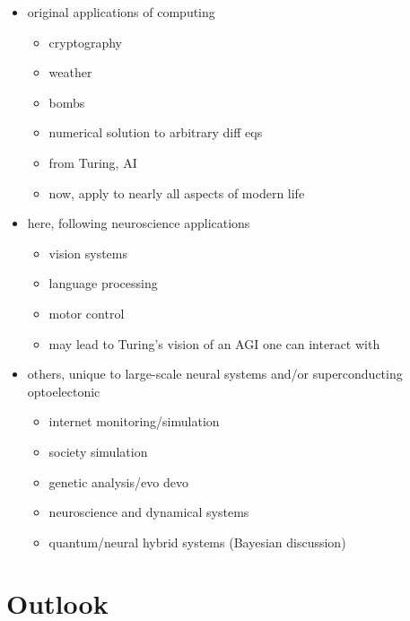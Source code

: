 \documentclass[twocolumn]{article}
\begin{document}
\begin{itemize}
\item original applications of computing
\begin{itemize}
\item cryptography
\item weather
\item bombs
\item numerical solution to arbitrary diff eqs
\item from Turing, AI
\item now, apply to nearly all aspects of modern life
\end{itemize}
\item here, following neuroscience applications 
\begin{itemize}
\item vision systems
\item language processing
\item motor control
\item may lead to Turing's vision of an AGI one can interact with
\end{itemize}
\item others, unique to large-scale neural systems and/or superconducting optoelectonic
\begin{itemize}
\item internet monitoring/simulation
\item society simulation
\item genetic analysis/evo devo
\item neuroscience and dynamical systems
\item quantum/neural hybrid systems (Bayesian discussion)
\end{itemize}
\end{itemize}

\section{\label{sec:outlook}Outlook}
\end{document}
